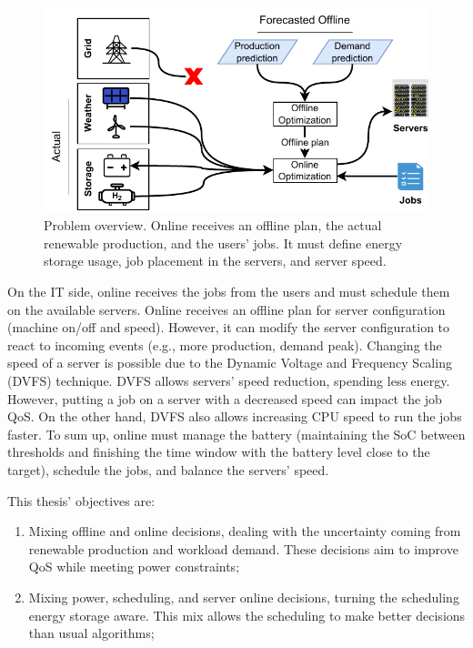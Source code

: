 \begin{figure}[!htb]
    \centering
    \includegraphics[scale=1]{Images/Introduction/Problem_overview_thesis.pdf}
    \caption[Problem overview]{Problem overview. Online receives an offline plan, the actual renewable production, and the users' jobs. It must define energy storage usage, job placement in the servers, and server speed.}
    \label{fig:introduction_problem}
\end{figure}

On the IT side, online receives the jobs from the users and must schedule them on the available servers. Online receives an offline plan for server configuration (machine on/off and speed). However, it can modify the server configuration to react to incoming events (e.g., more production, demand peak). Changing the speed of a server is possible due to the Dynamic Voltage and Frequency Scaling (DVFS) technique. DVFS allows servers' speed reduction, spending less energy. However, putting a job on a server with a decreased speed can impact the job QoS. On the other hand, DVFS also allows increasing CPU speed to run the jobs faster. To sum up, online must manage the battery (maintaining the SoC between thresholds and finishing the time window with the battery level close to the target), schedule the jobs, and balance the servers' speed.

This thesis' objectives are:
\begin{enumerate}
    \item Mixing offline and online decisions, dealing with the uncertainty coming from renewable production and workload demand. These decisions aim to improve QoS while meeting power constraints;
    \item Mixing power, scheduling, and server online decisions, turning the scheduling energy storage aware. This mix allows the scheduling to make better decisions than usual algorithms;
\end{enumerate}

